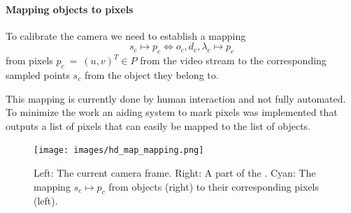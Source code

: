 \paragraph{Mapping objects to pixels}

To calibrate the camera we need to establish a mapping
\begin{equation}
  s_c \mapsto p_c \Leftrightarrow  {o_c, d_c, \lambda_c} \mapsto p_c
\end{equation}
from pixels $p_c~=~(u,v)^T \in P$ from the video stream to the corresponding sampled points $s_c$ from the object they belong to.

This mapping is currently done by human interaction and not fully automated. 
To minimize the work an aiding system to mark pixels was implemented that outputs a list of pixels that can easily be mapped to the list of objects.

\begin{figure}[t]
  \begin{center}
     \texttt{[image: images/hd\_map\_mapping.png]}
  \end{center}
     \caption{Left: The current camera frame. Right: A part of the \HDmaps{}. Cyan: The mapping $s_c \mapsto p_c$ from objects (right) to their corresponding pixels (left).}
  \label{fig:hd_map_mapping}
  \end{figure}


